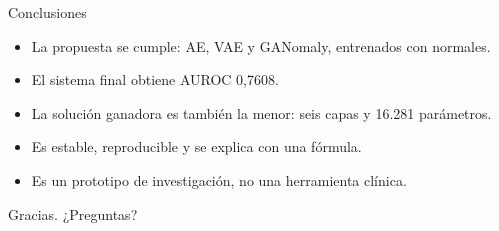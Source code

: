 \documentclass[aspectratio=169,10pt]{beamer}
\begin{document}
\begin{frame}{Conclusiones}
  \begin{itemize}
    \item La propuesta se cumple: AE, VAE y GANomaly, entrenados con normales.
    \item El sistema final obtiene AUROC 0,7608.
    \item La solución ganadora es también la menor: seis capas y 16.281
    parámetros.
    \item Es estable, reproducible y se explica con una fórmula.
    \item Es un prototipo de investigación, no una herramienta clínica.
  \end{itemize}
  \vfill
  \centering\Large Gracias. ¿Preguntas?
\end{frame}
\end{document}
